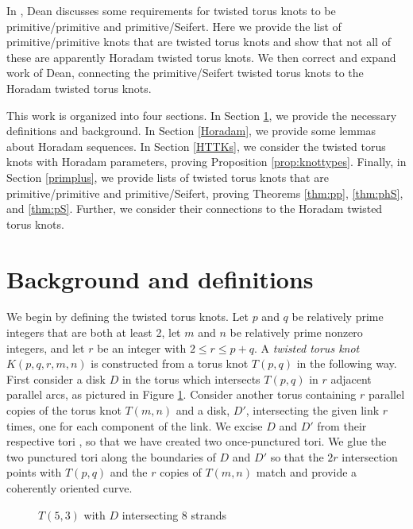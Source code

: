 \documentclass{amsart}
\begin{document}
In \cite{DeanSFSSurgeries}, Dean discusses some requirements for twisted torus knots to be primitive/primitive and primitive/Seifert. Here we provide the list of primitive/primitive knots that are twisted torus knots and show that not all of these are apparently Horadam twisted torus knots. We then correct and expand work of Dean, connecting the primitive/Seifert twisted torus knots to the Horadam twisted torus knots.

This work is organized into four sections. In Section \ref{background}, we provide the necessary definitions and background. In Section \ref{Horadam}, we provide some lemmas about Horadam sequences. In Section \ref{HTTKs}, we consider the twisted torus knots with Horadam parameters, proving Proposition \ref{prop:knottypes}. Finally, in Section \ref{primplus}, we provide lists of twisted torus knots that are primitive/primitive and primitive/Seifert, proving Theorems \ref{thm:pp}, \ref{thm:phS}, and \ref{thm:pS}. Further, we consider their connections to the Horadam twisted torus knots. 
 

\section{Background and definitions}\label{background}
We begin by defining the twisted torus knots. Let $p$ and $q$ be relatively prime integers that are both at least 2, let $m$ and $n$ be relatively prime nonzero integers, and let $r$ be an integer with $2 \le r \le p+q$. A \textit{twisted torus knot} $K(p,q,r,m,n)$ is constructed from a torus knot $T(p,q)$ in the following way. First consider a disk $D$ in the torus which intersects $T(p,q)$ in $r$ adjacent parallel arcs, as pictured in Figure \ref{fig:diskwithtorusknot}. Consider another torus containing $r$ parallel copies of the torus knot $T(m,n)$ and a disk, $D'$, intersecting the given link $r$ times, one for each component of the link. We excise $D$ and $D'$ from their respective tori , so that we have created two once-punctured tori. We glue the two punctured tori along the boundaries of $D$ and $D'$ so that the $2r$ intersection points with $T(p,q)$ and the $r$ copies of $T(m,n)$ match and provide a coherently oriented curve. 
\begin{center}
\begin{figure}
	\caption{$T(5,3)$ with $D$ intersecting 8 strands}\label{fig:diskwithtorusknot}
\end{figure}
\end{center}
\end{document}
